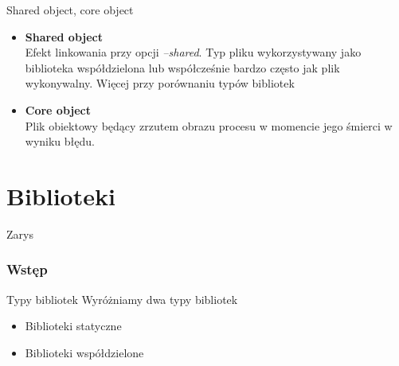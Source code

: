 \begin{frame}{Shared object, core object}
  \begin{itemize}
  \item \textbf{Shared object}\\
    Efekt linkowania przy opcji \textit{--shared}. Typ pliku wykorzystywany jako
    biblioteka współdzielona lub współcześnie bardzo często jak plik
    wykonywalny. Więcej przy porównaniu typów bibliotek
  \item \textbf{Core object}\\
    Plik obiektowy będący zrzutem obrazu procesu w momencie jego śmierci w
    wyniku błędu.
  \end{itemize}
\end{frame}
\part{Biblioteki}
\begin{frame}{Zarys}
  \tableofcontents
\end{frame}
\section{Wstęp}
\begin{frame}{Typy bibliotek}
  Wyróżniamy dwa typy bibliotek
  \begin{itemize}
  \item Biblioteki statyczne
  \item Biblioteki współdzielone
  \end{itemize}
\end{frame}
